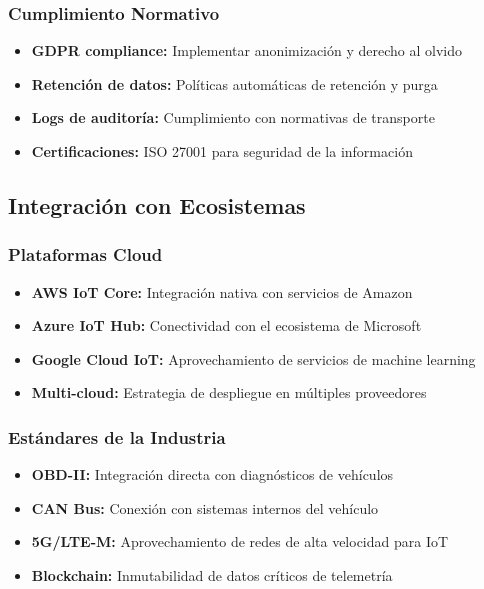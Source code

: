\subsubsection{Cumplimiento Normativo}
\begin{itemize}
    \item \textbf{GDPR compliance:} Implementar anonimización y derecho al olvido
    \item \textbf{Retención de datos:} Políticas automáticas de retención y purga
    \item \textbf{Logs de auditoría:} Cumplimiento con normativas de transporte
    \item \textbf{Certificaciones:} ISO 27001 para seguridad de la información
\end{itemize}

\subsection{Integración con Ecosistemas}

\subsubsection{Plataformas Cloud}
\begin{itemize}
    \item \textbf{AWS IoT Core:} Integración nativa con servicios de Amazon
    \item \textbf{Azure IoT Hub:} Conectividad con el ecosistema de Microsoft
    \item \textbf{Google Cloud IoT:} Aprovechamiento de servicios de machine learning
    \item \textbf{Multi-cloud:} Estrategia de despliegue en múltiples proveedores
\end{itemize}

\subsubsection{Estándares de la Industria}
\begin{itemize}
    \item \textbf{OBD-II:} Integración directa con diagnósticos de vehículos
    \item \textbf{CAN Bus:} Conexión con sistemas internos del vehículo
    \item \textbf{5G/LTE-M:} Aprovechamiento de redes de alta velocidad para IoT
    \item \textbf{Blockchain:} Inmutabilidad de datos críticos de telemetría
\end{itemize}

